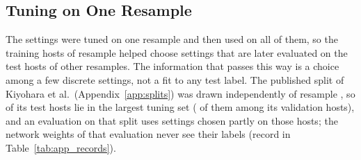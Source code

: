 \subsection{Tuning on One Resample}

The settings were tuned on one resample and then used on all of them, so the training hosts of resample \numCfgTuningAnchorResample{} helped choose settings that are later evaluated on the test hosts of other resamples. The information that passes this way is a choice among a few discrete settings, not a fit to any test label. The published split of Kiyohara et al.\ (Appendix~\ref{app:splits}) was drawn independently of resample \numCfgTuningAnchorResample{}, so \numCZeroOfficialTuningOverlapWithKiyoharaTestSixHundredFiftyFourInKiyoharaTest{} of its test hosts lie in the largest tuning set (\numCZeroOfficialTuningOverlapWithKiyoharaTestSixHundredFiftyFourOfWhichValidationHosts{} of them among its validation hosts), and an evaluation on that split uses settings chosen partly on those hosts; the network weights of that evaluation never see their labels (record in Table~\ref{tab:app_records}).

